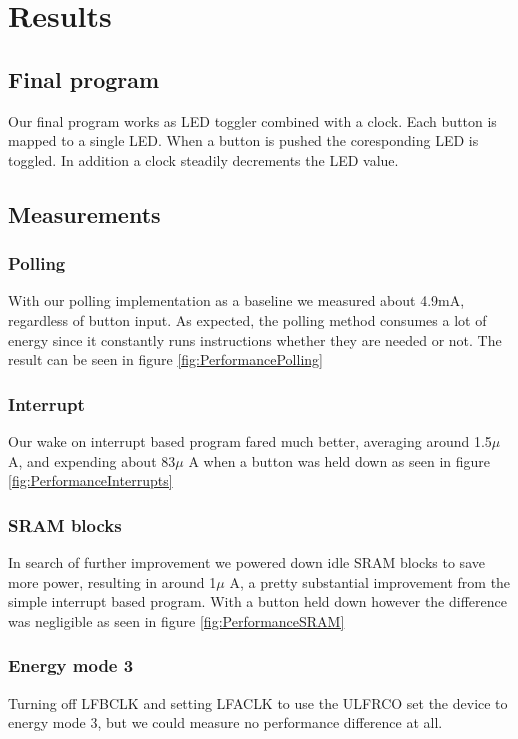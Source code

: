 \chapter{Results}

\section{Final program}
Our final program works as LED toggler combined with a clock. Each button is mapped to a single LED. When a button is pushed the coresponding LED is toggled. In addition a clock steadily decrements the LED value.

\section{Measurements}

\subsection{Polling}
With our polling implementation as a baseline we measured about 4.9mA, regardless of button input. As expected, the polling method consumes a lot of energy since it constantly runs instructions whether they are needed or not. The result can be seen in figure \ref{fig:PerformancePolling}

\subsection{Interrupt}
Our wake on interrupt based program fared much better, averaging around 1.5$\mu$ A, and expending about 83$\mu$ A when a button was held down as seen in figure \ref{fig:PerformanceInterrupts}

\subsection{SRAM blocks}
In search of further improvement we powered down idle SRAM blocks to save more power, resulting in around 1$\mu$ A, a pretty substantial improvement from the simple interrupt based program. With a button held down however the difference was negligible as seen in figure \ref{fig:PerformanceSRAM}

\subsection{Energy mode 3}
Turning off LFBCLK and setting LFACLK to use the ULFRCO set the device to energy mode 3, but we could measure no performance difference at all.

